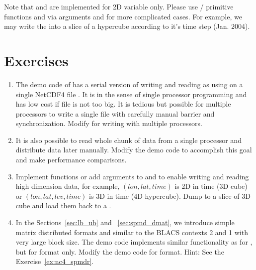 Note that  and  are implemented
for 2D variable only. Please use / primitive functions
 and  via arguments 
and  for more complicated cases. For example, we may write
the  into a slice of a hypercube according to it's time step
(Jan. 2004).


\section{Exercises}
\label{sec:pbdNCDF4_exercise}

\begin{enumerate}[label=\thechapter-\arabic*]
\item
The demo code  of  has a serial version
of writing and reading  as using  on a single
NetCDF4 file . It is in the sense of single processor
programming and has low cost if file is not too big.
It is tedious but possible for multiple processors to write
a single file with carefully manual barrier and synchronization.
Modify  for writing with multiple processors.

\item
It is also possible to read whole chunk of data from a single processor
and distribute data later manually. Modify the demo code
 to accomplish this goal and make performance
comparisons.

\item
Implement functions or add arguments to  and
 to enable writing and reading high dimension data,
for example, $(lon, lat, time)$ is 2D in time (3D cube) or
$(lon, lat, lev, time)$ is 3D in time (4D hypercube).
Dump  to a slice of 3D cube and load them back to a
.

\item
In the Sections~\ref{sec:lb_ub} and ~\ref{sec:spmd_dmat}, we introduce
simple matrix distributed formats  and  similar to
the BLACS contexts  2 and 1 with very large block size.
The demo code
 implements similar functionality as for
, but for  format only. Modify the demo code for
 format.
{\color{blue}Hint: See the Exercise~\ref{ex:nc4_spmdr}.
}

\end{enumerate}

